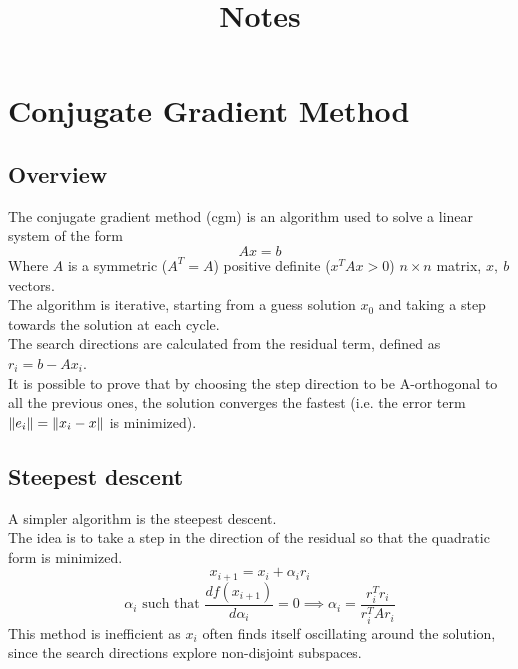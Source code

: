 \documentclass{article}
\title{Notes}
\date{}
\begin{document}
\maketitle
\section{Conjugate Gradient Method}
\subsection{Overview}
The conjugate gradient method (cgm) is an algorithm used to solve a linear system of the form
\begin{equation}
    Ax = b
\end{equation}
Where $A$ is a symmetric ($A^T=A$) positive definite ($x^TAx>0$) $n\times n$ matrix, $x,\ b$ vectors.
\\The algorithm is iterative, starting from a guess solution $x_0$ and taking a step towards the solution at each cycle.
\\The search directions are calculated from the residual term, defined as $r_i=b - Ax_i$. 
\\It is possible to prove that by choosing the step direction to be A-orthogonal to all the previous ones, the solution converges the fastest (i.e. the error term $\norm{e_i}=\norm{x_i-x}$ is minimized).
\subsection{Steepest descent}
A simpler algorithm is the steepest descent.
\\The idea is to take a step in the direction of the residual so that the quadratic form is minimized.
\begin{equation}
    x_{i+1} = x_i + \alpha_i r_i 
\end{equation}
\begin{equation}
    \alpha_i \text{ such that } \frac{d f(x_{i+1})}{d\alpha_i} = 0 \implies \alpha_i = \frac{r_i^T r_i}{r_i^T A r_i}
\end{equation}
This method is inefficient as $x_i$ often finds itself oscillating around the solution, since the search directions explore non-disjoint subspaces.
\end{document}
